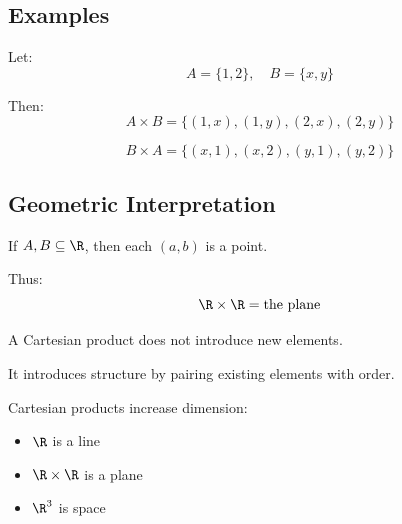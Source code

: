 \documentclass[11pt]{article}
\begin{document}
\subsection*{Examples}

\begin{theorybox}

Let:
\[
A = \{1,2\}, \quad B = \{x,y\}
\]

Then:
\[
A \times B =
\{(1,x),(1,y),(2,x),(2,y)\}
\]

\[
B \times A =
\{(x,1),(x,2),(y,1),(y,2)\}
\]

\end{theorybox}

\subsection*{Geometric Interpretation}

If $A, B \subseteq \R$, then each $(a,b)$ is a point.

\begin{center}
\end{center}

Thus:
\[
\R \times \R = \text{the plane}
\]

\begin{remarkbox}

A Cartesian product does not introduce new elements.

It introduces structure by pairing existing elements with order.

\end{remarkbox}

\begin{remarkbox}

Cartesian products increase dimension:

\begin{itemize}
\item $\R$ is a line
\item $\R \times \R$ is a plane
\item $\R^3$ is space
\end{itemize}

\end{remarkbox}
\end{document}
